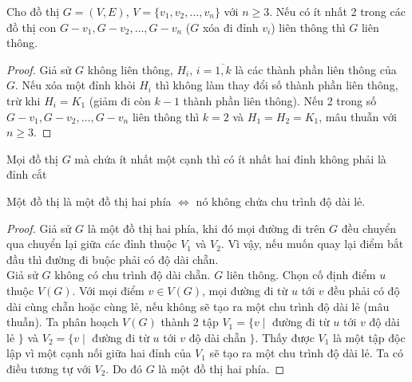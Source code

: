 \begin{proposition}
	Cho đồ thị $G = (V,E)$, $V=\{v_1, v_2,\ldots,v_n\}$ với $n \ge 3$. Nếu có ít nhất 2 trong các đồ thị con $G-v_1,G-v_2,\ldots,G-v_n$ ($G$ xóa đi đỉnh $v_i$) liên thông thì $G$ liên thông.
	\begin{proof}
		Giả sử $G$ không liên thông, $H_i,\, i = \overline{1,k}$ là các thành phần liên thông của $G$. Nếu xóa một đỉnh khỏi $H_i$ thì không làm thay đổi số thành phần liên thông, trừ khi $H_i = K_1$ (giảm đi còn $k-1$ thành phần liên thông). Nếu 2 trong số $G-v_1,G-v_2,\ldots,G-v_n$ liên thông thì $k = 2$ và $H_1 = H_2 = K_1$, mâu thuẫn với $n \ge 3$.
	\end{proof}
\end{proposition}

\begin{corollary} Mọi đồ thị $G$ mà chứa ít nhất một cạnh thì có ít nhất hai đỉnh không phải là đỉnh cắt\end{corollary}
\begin{theorem}
Một đồ thị là một đồ thị hai phía $\iff$ nó không chứa chu trình độ dài lẻ.	
\begin{proof}
	Giả sử $G$ là một đồ thị hai phía, khi đó mọi đường đi trên $G$ đều chuyển qua chuyển lại giữa các đỉnh thuộc $V_1$ và $V_2$. Vì vậy, nếu muốn quay lại điểm bắt đầu thì đường đi buộc phải có độ dài chẵn.\\
	Giả sử $G$ không có chu trình độ dài chẵn. $G$ liên thông. Chọn cố định điểm $u$ thuộc $V(G)$. Với mọi điểm $v \in V(G)$, mọi đường đi từ $u$ tới $v$ đều phải có độ dài cùng chẵn hoặc cùng lẻ, nếu không sẽ tạo ra một chu trình độ dài lẻ (mâu thuẫn). Ta phân hoạch $V(G)$ thành 2 tập $V_1 = \{v\mid$ đường đi từ $u$ tới $v$ độ dài lẻ $\}$ và $V_2 = \{v\mid$ đường đi từ $u$ tới $v$ độ dài chẵn $\}$. Thấy được $V_1$ là một tập độc lập vì một cạnh nối giữa hai đỉnh của $V_1$ sẽ tạo ra một chu trình độ dài lẻ. Ta có điều tương tự với $V_2$. Do đó $G$ là một đồ thị hai phía.
\end{proof}
\end{theorem}


